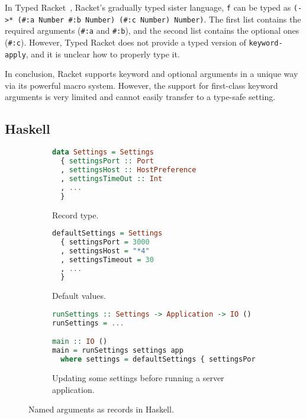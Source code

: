 In Typed Racket~\citep{typedracket}, Racket's gradually typed sister language,
\lstinline{f} can be typed as
\lstinline[language=Racket]{(->* (#:a Number #:b Number) (#:c Number) Number)}.
The first list contains the required arguments
(\lstinline[language=Racket]{#:a} and \lstinline[language=Racket]{#:b}), and the
second list contains the optional ones (\lstinline[language=Racket]{#:c}). However,
Typed Racket does not provide a typed version of
\lstinline[language=Racket]{keyword-apply}, and it is unclear how to properly type it.

In conclusion, Racket supports keyword and optional arguments in a unique way
via its powerful macro system. However, the support for first-class keyword arguments
is very limited and cannot easily transfer to a type-safe setting.

\subsection{Haskell}

\begin{figure}[b!]
\begin{subfigure}{0.45\textwidth}
\begin{lstlisting}[language=Haskell]
data Settings = Settings
  { settingsPort :: Port
  , settingsHost :: HostPreference
  , settingsTimeOut :: Int
  , ...
  }
\end{lstlisting}
\caption{Record type.} \label{fig:settings}
\end{subfigure}
\hfill
\begin{subfigure}{0.35\textwidth}
\begin{lstlisting}[language=Haskell]
defaultSettings = Settings
  { settingsPort = 3000
  , settingsHost = "*4"
  , settingsTimeout = 30
  , ...
  }
\end{lstlisting}
\caption{Default values.} \label{fig:default}
\end{subfigure}
\par\bigskip
\begin{subfigure}{\textwidth}
\begin{lstlisting}[language=Haskell]
runSettings :: Settings -> Application -> IO ()
runSettings = ...

main :: IO ()
main = runSettings settings app
  where settings = defaultSettings { settingsPort = 4000, settingsHost = "*6" }
\end{lstlisting}
\caption{Updating some settings before running a server application.} \label{fig:update}
\end{subfigure}
\caption{Named arguments as records in Haskell.}
\end{figure}

